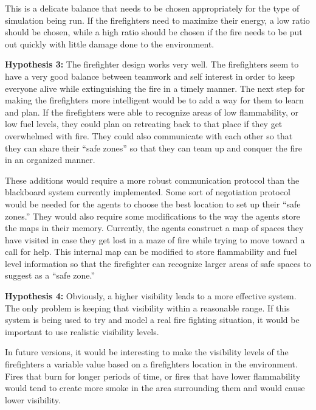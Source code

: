 \documentclass{article}
\begin{document}
\begin{description}
      This is a delicate balance that needs to be chosen appropriately for the
      type of simulation being run. If the firefighters need to maximize their
      energy, a low ratio should be chosen, while a high ratio should be chosen
      if the fire needs to be put out quickly with little damage done to the
      environment.

    \item \textbf{Hypothesis 3:}
      The firefighter design works very well. The firefighters seem to have a
      very good balance between teamwork and self interest in order to keep
      everyone alive while extinguishing the fire in a timely manner. The
      next step for making the firefighters more intelligent would be to
      add a way for them to learn and plan. If the firefighters were able
      to recognize areas of low flammability, or low fuel levels, they could
      plan on retreating back to that place if they get overwhelmed with fire.
      They could also communicate with each other so that they can share their
      ``safe zones'' so that they can team up and conquer the fire in an
      organized manner.

      These additions would require a more robust communication protocol than
      the blackboard system currently implemented. Some sort of negotiation
      protocol would be needed for the agents to choose the best location to
      set up their ``safe zones.'' They would also require some modifications
      to the way the agents store the maps in their memory. Currently, the
      agents construct a map of spaces they have visited in case they
      get lost in a maze of fire while trying to move toward a call for help.
      This internal map can be modified to store flammability and fuel level
      information so that the firefighter can recognize larger areas of safe
      spaces to suggest as a ``safe zone.''

    \item \textbf{Hypothesis 4:}
      Obviously, a higher visibility leads to a more effective system. The
      only problem is keeping that visibility within a reasonable range. If
      this system is being used to try and model a real fire fighting
      situation, it would be important to use realistic visibility levels.

      In future versions, it would be interesting to make the visibility
      levels of the firefighters a variable value based on a firefighters
      location in the environment. Fires that burn for longer periods of
      time, or fires that have lower flammability would tend to create more
      smoke in the area surrounding them and would cause lower visibility.


\end{description}
\end{document}
